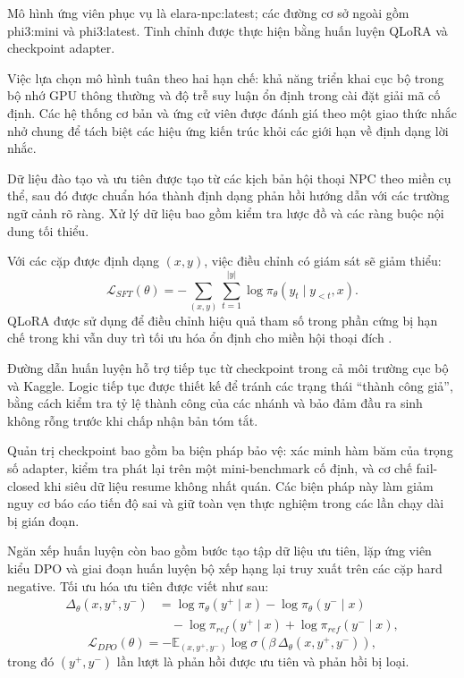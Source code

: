 ﻿\documentclass[a4paper,12pt]{article}
\begin{document}
Mô hình ứng viên phục vụ là elara-npc:latest; các đường cơ sở ngoài gồm phi3:mini và phi3:latest. Tinh chỉnh được thực hiện bằng huấn luyện QLoRA và checkpoint adapter.

Việc lựa chọn mô hình tuân theo hai hạn chế: khả năng triển khai cục bộ trong bộ nhớ GPU thông thường và độ trễ suy luận ổn định trong cài đặt giải mã cố định. Các hệ thống cơ bản và ứng cử viên được đánh giá theo một giao thức nhắc nhở chung để tách biệt các hiệu ứng kiến trúc khỏi các giới hạn về định dạng lời nhắc.

Dữ liệu đào tạo và ưu tiên được tạo từ các kịch bản hội thoại NPC theo miền cụ thể, sau đó được chuẩn hóa thành định dạng phản hồi hướng dẫn với các trường ngữ cảnh rõ ràng. Xử lý dữ liệu bao gồm kiểm tra lược đồ và các ràng buộc nội dung tối thiểu.

Với các cặp được định dạng \((x,y)\), việc điều chỉnh có giám sát sẽ giảm thiểu:
\begin{equation}
\mathcal{L}_{SFT}(\theta) = -\sum_{(x,y)}\sum_{t=1}^{|y|}\log \pi_\theta(y_t\mid y_{<t},x).
\end{equation}
QLoRA được sử dụng để điều chỉnh hiệu quả tham số trong phần cứng bị hạn chế trong khi vẫn duy trì tối ưu hóa ổn định cho miền hội thoại đích \cite{Dettmers2023QLoRA}.

Đường dẫn huấn luyện hỗ trợ tiếp tục từ checkpoint trong cả môi trường cục bộ và Kaggle. Logic tiếp tục được thiết kế để tránh các trạng thái “thành công giả”, bằng cách kiểm tra tỷ lệ thành công của các nhánh và bảo đảm đầu ra sinh không rỗng trước khi chấp nhận bản tóm tắt.

Quản trị checkpoint bao gồm ba biện pháp bảo vệ: xác minh hàm băm của trọng số adapter, kiểm tra phát lại trên một mini-benchmark cố định, và cơ chế fail-closed khi siêu dữ liệu resume không nhất quán. Các biện pháp này làm giảm nguy cơ báo cáo tiến độ sai và giữ toàn vẹn thực nghiệm trong các lần chạy dài bị gián đoạn.

Ngăn xếp huấn luyện còn bao gồm bước tạo tập dữ liệu ưu tiên, lặp ứng viên kiểu DPO và giai đoạn huấn luyện bộ xếp hạng lại truy xuất trên các cặp hard negative. Tối ưu hóa ưu tiên được viết như sau:
\begin{equation}
\begin{aligned}
\Delta_\theta(x,y^+,y^-)
&= \log \pi_\theta(y^+\mid x)-\log \pi_\theta(y^-\mid x) \\
&\quad -\log \pi_{ref}(y^+\mid x)+\log \pi_{ref}(y^-\mid x),
\end{aligned}
\end{equation}
\begin{equation}
\mathcal{L}_{DPO}(\theta)=
-\mathbb{E}_{(x,y^+,y^-)}\log \sigma\!\left(\beta\,\Delta_\theta(x,y^+,y^-)\right),
\end{equation}
trong đó \((y^+,y^-)\) lần lượt là phản hồi được ưu tiên và phản hồi bị loại.
\end{document}
